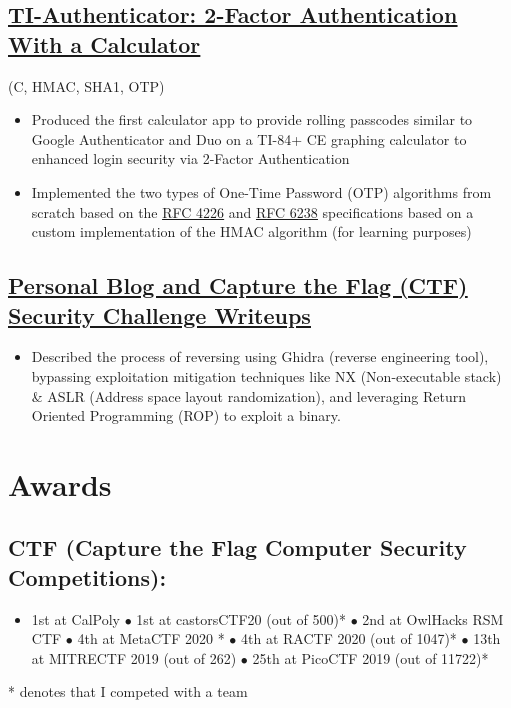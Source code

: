 \documentclass{article}
\begin{document}
\subsection{\href{https://github.com/jshin313/ti-authenticator}{\underline{TI-Authenticator: 2-Factor Authentication With a Calculator}}} \hfill (C, HMAC, SHA1, OTP)
\begin{itemize}
    \item Produced the first calculator app to provide rolling passcodes similar to Google Authenticator and Duo on a TI-84+ CE graphing calculator to enhanced login security via 2-Factor Authentication
    \item Implemented the two types of One-Time Password (OTP) algorithms from scratch based on the \href{https://tools.ietf.org/html/rfc4226}{\underline{RFC 4226}} and \href{https://tools.ietf.org/html/rfc6238}{\underline{RFC 6238}} specifications based on a custom implementation of the HMAC algorithm (for learning purposes)
\end{itemize}

\subsection{\href{https://jacobshin.com/posts/}{ \underline{Personal Blog and Capture the Flag (CTF) Security Challenge Writeups}}}
\begin{itemize}
    \item Described the process of reversing using Ghidra (reverse engineering tool), bypassing exploitation mitigation techniques like NX (Non-executable stack) \& ASLR (Address space layout randomization), and leveraging Return Oriented Programming (ROP) to exploit a binary.
\end{itemize}

\section{Awards}
\subsection{CTF (Capture the Flag Computer Security Competitions):}
\begin{itemize}
    \item 1st at CalPoly $\bullet$ 1st at castorsCTF20 (out of 500)* $\bullet$ 2nd at OwlHacks RSM CTF $\bullet$ 4th at MetaCTF 2020 * $\bullet$ 4th at RACTF 2020 (out of 1047)* $\bullet$ 13th at MITRECTF 2019 (out of 262) $\bullet$ 25th at PicoCTF 2019 (out of 11722)*
\end{itemize} 
* denotes that I competed with a team
\end{document}
